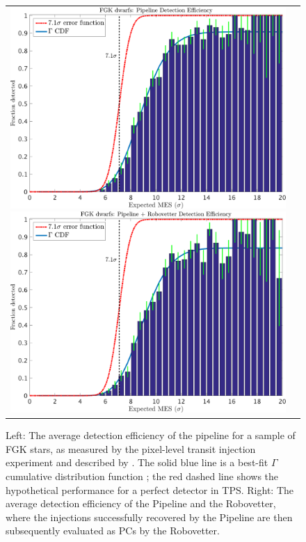 \begin{figure}[ht]
\centering
\hspace{-2.5em}\begin{tabular}{cc}
\includegraphics[width=0.5\linewidth]{fig-senscurvwithfits_withoutRv-trimmed.pdf} 
\includegraphics[width=0.5\linewidth]{fig-senscurvwithfits_withRv-trimmed.pdf}
\end{tabular}
\caption{Left: The average detection efficiency of the pipeline for a sample of FGK stars, as measured by the pixel-level transit injection experiment and described by \citet{Christiansen2017}. The solid blue line is a best-fit $\Gamma$ cumulative distribution function \citep[see Equation 1 of ][]{Christiansen2016}; the red dashed line shows the hypothetical performance for a perfect detector in TPS. Right: The average detection efficiency of the \Kepler{} Pipeline and the Robovetter, where the injections successfully recovered by the Pipeline are then subsequently evaluated as PCs by the Robovetter.}

\label{f:fulldetectionefficiency}

\end{figure}


